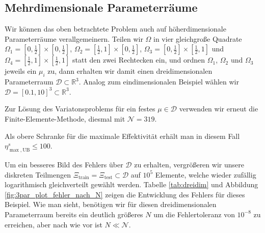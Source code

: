 \subsection{Mehrdimensionale Parameterräume} %
\label{sub:mehrdimensionale_parameterr_ume}

Wir können das oben betrachtete Problem auch auf höherdimensionale Parameterräume verallgemeinern. Teilen wir $\Omega$ in vier gleichgroße Quadrate $\Omega_1 = [0, \frac 12] \times [0, \frac 12]$, $\Omega_2 = [\frac 12, 1] \times [0, \frac 12]$, $\Omega_3 = [0, \frac 12] \times [\frac 12, 1]$ und $\Omega_4 = [\frac 12, 1] \times [\frac 12, 1]$ statt den zwei Rechtecken ein, und ordnen $\Omega_1$, $\Omega_2$ und $\Omega_3$ jeweils ein $\mu_i$ zu, dann erhalten wir damit einen dreidimensionalen Parameterraum $\mathcal D \subset \mathbb{R}^3$. Analog zum eindimensionalen Beispiel wählen wir $\mathcal D = [0.1, 10]^3 \subset \mathbb{R}^3$.

Zur Lösung des Variatonsproblems für ein festes $\mu \in \mathcal D$ verwenden wir erneut die Finite-Elemente-Methode, diesmal mit $\mathcal N = 319$.

Als obere Schranke für die maximale Effektivität erhält man in diesem Fall $\eta^s_{\max,\text{UB}}  \leq 100$.

Um ein besseres Bild des Fehlers über $\mathcal D$ zu erhalten, vergrößeren wir unsere diskreten Teilmengen $\Xi_\text{train} = \Xi_\text{test} \subset \mathcal D$ auf $10^5$ Elemente, welche wieder zufällig logarithmisch gleichverteilt gewählt werden.
Tabelle \ref{tab:dreidim} und Abbildung \ref{fig:3par_plot_fehler_nach_N} zeigen die Entwicklung des Fehlers für dieses Beispiel. Wie man sieht, benötigen wir für diesen dreidimensionalen Parameterraum bereits ein deutlich größeres $N$ um die Fehlertoleranz von $10^{-8}$ zu erreichen, aber nach wie vor ist $N \ll \mathcal N$.

